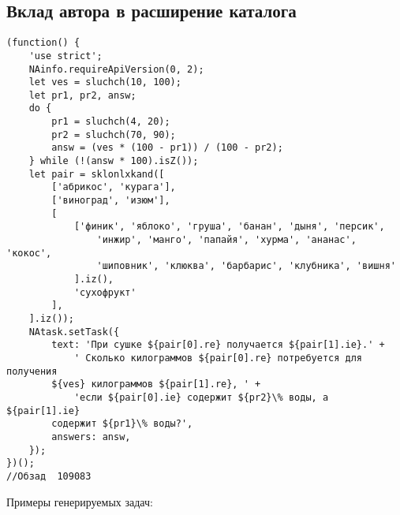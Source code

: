 \subsection{Вклад автора в расширение каталога}
\begin{lstlisting}
(function() {
	'use strict';
	NAinfo.requireApiVersion(0, 2);
	let ves = sluchch(10, 100);
	let pr1, pr2, answ;
	do {
		pr1 = sluchch(4, 20);
		pr2 = sluchch(70, 90);
		answ = (ves * (100 - pr1)) / (100 - pr2);
	} while (!(answ * 100).isZ());
	let pair = sklonlxkand([
		['абрикос', 'курага'],
		['виноград', 'изюм'],
		[
			['финик', 'яблоко', 'груша', 'банан', 'дыня', 'персик',
				'инжир', 'манго', 'папайя', 'хурма', 'ананас', 'кокос',
				'шиповник', 'клюква', 'барбарис', 'клубника', 'вишня'
			].iz(),
			'сухофрукт'
		],
	].iz());
	NAtask.setTask({
		text: 'При сушке ${pair[0].re} получается ${pair[1].ie}.' +
			' Сколько килограммов ${pair[0].re} потребуется для получения 
		${ves} килограммов ${pair[1].re}, ' +
			'если ${pair[0].ie} содержит ${pr2}\% воды, а ${pair[1].ie} 
		содержит ${pr1}\% воды?',
		answers: answ,
	});
})();
//Обзад  109083
		\end{lstlisting}
Примеры генерируемых задач:

\vspace{\baselineskip}
\vspace{\baselineskip}

\vspace{\baselineskip}

\vspace{\baselineskip}

